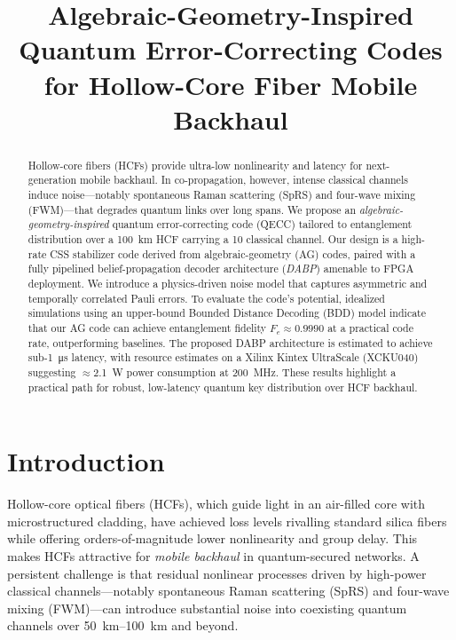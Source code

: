 \documentclass[conference]{IEEEtran}
\begin{document}
\title{Algebraic-Geometry-Inspired Quantum Error-Correcting Codes for Hollow-Core Fiber Mobile Backhaul}

\author{}

\maketitle

\begin{abstract}
Hollow-core fibers (HCFs) provide ultra-low nonlinearity and latency for next-generation mobile backhaul. In co-propagation, however, intense classical channels induce noise---notably spontaneous Raman scattering (SpRS) and four-wave mixing (FWM)---that degrades quantum links over long spans. We propose an \emph{algebraic-geometry-inspired} quantum error-correcting code (QECC) tailored to entanglement distribution over a \SI{100}{\kilo\meter} HCF carrying a \SI{10}{\dBm} classical channel. Our design is a high-rate CSS stabilizer code derived from algebraic-geometry (AG) codes, paired with a fully pipelined belief-propagation decoder architecture (\emph{DABP}) amenable to FPGA deployment. We introduce a physics-driven noise model that captures asymmetric and temporally correlated Pauli errors. To evaluate the code's potential, idealized simulations using an upper-bound Bounded Distance Decoding (BDD) model indicate that our AG code can achieve entanglement fidelity \(F_e \approx 0.9990\) at a practical code rate, outperforming baselines. The proposed DABP architecture is estimated to achieve sub-\SI{1}{\micro\second} latency, with resource estimates on a Xilinx Kintex UltraScale (XCKU040) suggesting \(\approx\)\SI{2.1}{\watt} power consumption at \SI{200}{\mega\hertz}. These results highlight a practical path for robust, low-latency quantum key distribution over HCF backhaul.
\end{abstract}

\section{Introduction}
Hollow-core optical fibers (HCFs), which guide light in an air-filled core with microstructured cladding, have achieved loss levels rivalling standard silica fibers while offering orders-of-magnitude lower nonlinearity and group delay. This makes HCFs attractive for \emph{mobile backhaul} in quantum-secured networks. A persistent challenge is that residual nonlinear processes driven by high-power classical channels---notably spontaneous Raman scattering (SpRS) and four-wave mixing (FWM)---can introduce substantial noise into coexisting quantum channels over \SIrange{50}{100}{\kilo\meter} and beyond.
\end{document}
